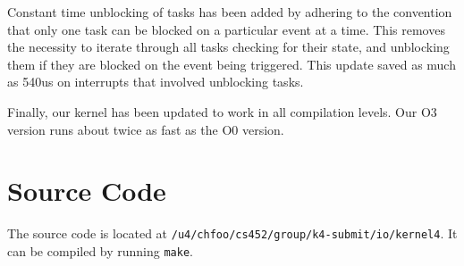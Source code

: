 \documentclass[letterpaper]{article}
\begin{document}
Constant time unblocking of tasks has been added by adhering to the convention that only one task can be blocked on a particular event at a time.  This removes the necessity to iterate through all tasks checking for their state, and unblocking them if they are blocked on the event being triggered.  This update saved as much as 540us on interrupts that involved unblocking tasks.

Finally, our kernel has been updated to work in all compilation levels.  Our O3 version runs about twice as fast as the O0 version.


\section{Source Code%
  \label{source-code}%
}

The source code is located at \texttt{/u4/chfoo/cs452/group/k4-submit/io/kernel4}. It can be compiled by running \texttt{make}.
\end{document}
